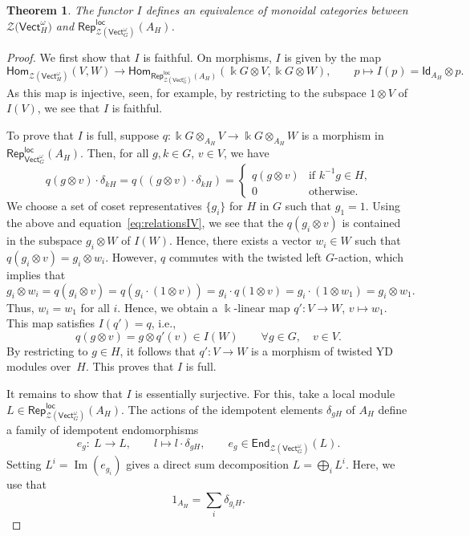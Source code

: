 \documentclass[10pt,a4paper]{amsart}
\numberwithin{equation}{section}
\newtheorem{Theorem}{Theorem}[section]
\newcommand{\End}{\mathsf{End}}
\newcommand{\Hom}{\mathsf{Hom}}
\newcommand{\ide}{\mathsf{Id}}
\newcommand{\Img}{\operatorname{Im}}
\newcommand{\locmod}{\mathsf{Rep}^{\mathsf{loc}}}
\newcommand{\Vect}{\mathsf{Vect}}
\newcommand{\cZ}{\mathcal{Z}}
\newcommand{\rI}{I}
\begin{document}
\begin{Theorem}\label{thm:Iequiv}
The functor $\rI$ defines an equivalence of monoidal categories between $\cZ\big(\Vect_H^\omega\big)$ and $\locmod_{\cZ(\Vect_G^\omega)}(A_H)$.
\end{Theorem}
\begin{proof}
We first show that $I$ is faithful. On morphisms, $I$ is given by the map
\[\Hom_{\cZ(\Vect_H^\omega)}(V,W)\to \Hom_{\locmod_{\cZ(\Vect_G^\omega)}(A_H)}(\Bbbk G \otimes V,\Bbbk G \otimes W), \qquad p\mapsto I(p)=\ide_{A_H}\otimes p.\]
As this map is injective, seen, for example, by restricting to the subspace $1\otimes V$ of $I(V)$, we see that $I$ is faithful.

To prove that $I$ is full, suppose $q\colon \Bbbk G \otimes_{A_H} V\to \Bbbk G \otimes_{A_H} W$ is a morphism in $\locmod_{\Vect_G^\omega}(A_H)$.
Then,
for all $g,k\in G$, $v\in V$, we have
 \[q(g\otimes v) \cdot \delta_{kH} = q((g\otimes v) \cdot \delta_{kH}) =
\begin{cases}
q(g\otimes v) & \text{if $k^{-1}g \in H$,}\\
0 & \text{otherwise}.
\end{cases}
\]
We choose a set of coset representatives $\{g_i\}$ for $H$ in $G$ such that $g_1=1$.
Using the above and equation~\eqref{eq:relationsIV}, we see that the $q(g_i\otimes v)$ is contained in the subspace $g_i\otimes W$ of $I(W)$. Hence, there exists a vector $w_i\in W$ such that
$q(g_i\otimes v) = g_i\otimes w_i$. However, $q$ commutes with the twisted left $G$-action, which implies that
\[
g_i\otimes w_i=q(g_i\otimes v)= q(g_i\cdot (1\otimes v))=g_i\cdot q(1\otimes v)=g_i\cdot (1\otimes w_1)=g_i\otimes w_1.
\]
Thus, $w_i=w_1$ for all $i$. Hence, we obtain a $\Bbbk$-linear map $q'\colon V\to W$, $v\mapsto w_1$. This map satisfies $I(q')=q$, i.e.,
\[q(g\otimes v)=g\otimes q'(v)\in I(W) \qquad \forall g\in G,\quad v\in V.\]
By restricting to $g\in H$, it follows that $q'\colon V\to W$ is a morphism of twisted YD modules over~$H$. This proves that $I$ is full.

It remains to show that $I$ is essentially surjective. For this, take a local module $L \in \locmod_{\cZ(\Vect_G^\omega)}(A_H)$. The actions of the idempotent elements $\delta_{gH}$ of $A_H$ define a family of idempotent endomorphisms
\[e_g\colon\ L\to L, \qquad l\mapsto l\cdot \delta_{gH},\qquad e_g\in \End_{\cZ(\Vect_G^\omega)}(L).\]
Setting $L^i = \Img(e_{g_i})$ gives a direct sum decomposition $L=\bigoplus\limits_{i}L^{i}$. Here, we use that \[1_{A_H}=\sum\limits_{i}\delta_{g_iH}.\]


\end{proof}
\end{document}
